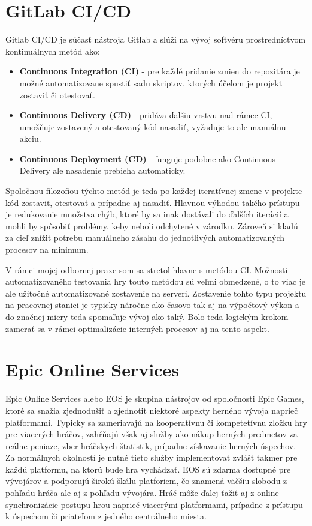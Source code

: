 \documentclass[slovak, bachelorpractice]{diploma}
\begin{document}
\section{GitLab CI/CD}
\label{sec:GitLab}
Gitlab CI/CD \cite{Cicd} je súčasť nástroja Gitlab a slúži na vývoj softvéru prostredníctvom kontinuálnych metód ako:
\begin{itemize}
  \item \textbf{Continuous Integration (CI)} - pre každé pridanie zmien do repozitára je možné automatizovane spustiť sadu skriptov, ktorých účelom je projekt zostaviť či otestovať.
  \item \textbf{Continuous Delivery (CD)} - pridáva ďalšiu vrstvu nad rámec CI, umožňuje zostavený a otestovaný kód nasadiť, vyžaduje to ale manuálnu akciu.
  \item \textbf{Continuous Deployment (CD)} - funguje podobne ako Continuous Delivery ale nasadenie prebieha automaticky.
\end{itemize}
Spoločnou filozofiou týchto metód je teda po každej iteratívnej zmene v projekte kód zostaviť, otestovať a prípadne aj nasadiť. Hlavnou výhodou takého prístupu je redukovanie množstva chýb, ktoré by sa inak dostávali do ďalších iterácií a mohli by spôsobiť problémy, keby neboli odchytené v zárodku. Zároveň si kladú za cieľ znížiť potrebu manuálneho zásahu do jednotlivých automatizovaných procesov na minimum.

V rámci mojej odbornej praxe som sa stretol hlavne s metódou CI. Možnosti automatizovaného testovania hry touto metódou sú veľmi obmedzené, o to viac je ale užitočné automatizované zostavenie na serveri. Zostavenie tohto typu projektu na pracovnej stanici je typicky náročne ako časovo tak aj na výpočtový výkon a do značnej miery teda spomaľuje vývoj ako taký. Bolo teda logickým krokom zamerať sa v rámci optimalizácie interných procesov aj na tento aspekt.

\section{Epic Online Services}
\label{sec:Eos}
Epic Online Services alebo EOS \cite{Epic} je skupina nástrojov od spoločnosti Epic Games, ktoré sa snažia zjednodušiť a zjednotiť niektoré aspekty herného vývoja naprieč platformami. Typicky sa zameriavajú na kooperatívnu či kompetetívnu zložku hry pre viacerých hráčov, zahŕňajú však aj služby ako nákup herných predmetov za reálne peniaze, zber hráčskych štatistik, prípadne získavanie herných úspechov. Za normálnych okolností je nutné tieto služby implementovať zvlášť takmer pre každú platformu, na ktorú bude hra vychádzať. EOS sú zdarma dostupné pre vývojárov a podporujú širokú škálu platforiem, čo znamená väčšiu slobodu z pohľadu hráča ale aj z pohľadu vývojára. Hráč môže ďalej ťažiť aj z online synchronizácie postupu hrou naprieč viacerými platformami, prípadne z prístupu k úspechom či priateľom z jedného centrálneho miesta. 
\end{document}
